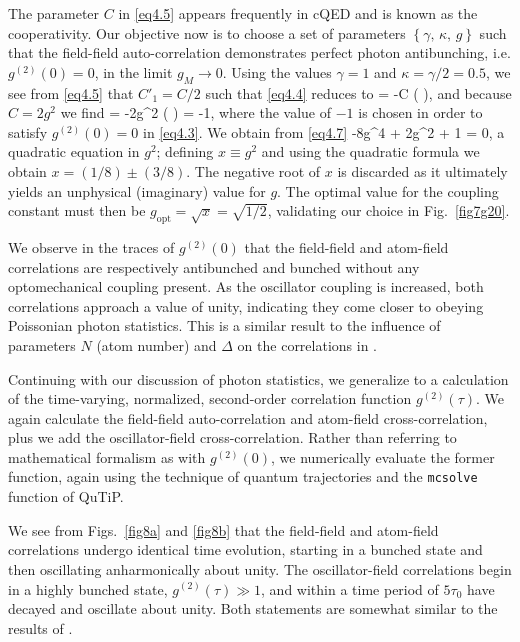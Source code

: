 \noindent The parameter $C$ in \eqref{eq4.5} appears frequently in cQED and is known as the cooperativity. Our objective now is to choose a set of parameters $\left\{ \gamma, \, \kappa, \, g \right\}$ such that the field-field auto-correlation demonstrates perfect photon antibunching, i.e. $g^{(2)}(0) = 0$, in the limit $g_M \to 0$. Using the values $\gamma = 1$ and $\kappa = \gamma/2 = 0.5$, we see from \eqref{eq4.5} that $C'_1 = C/2$ such that \eqref{eq4.4} reduces to
%
\be \frac{\Delta\alpha}{\alpha} = -C \left(  \right), \label{eq4.6} \ee
%
and because $C = 2g^2$ we find
%
\be \frac{\Delta\alpha}{\alpha} = -2g^2 \left(  \right) = -1, \label{eq4.7} \ee
%
where the value of $-1$ is chosen in order to satisfy $g^{(2)}(0) = 0$ in \eqref{eq4.3}. We obtain from \eqref{eq4.7}
%
\be -8g^4 + 2g^2 + 1 = 0, \label{eq4.8} \ee
%
a quadratic equation in $g^2$; defining $x \equiv g^2$ and using the quadratic formula we obtain $x = (1/8) \pm (3/8)$. The negative root of $x$ is discarded as it ultimately yields an unphysical (imaginary) value for $g$. The optimal value for the coupling constant must then be $g_{\text{opt}} = \sqrt{x} = \sqrt{1/2}$, validating our choice in Fig.~\ref{fig7g20}.

We observe in the traces of $g^{(2)}(0)$ that the field-field and atom-field correlations are respectively antibunched and bunched without any optomechanical coupling present. As the oscillator coupling is increased, both correlations approach a value of unity, indicating they come closer to obeying Poissonian photon statistics. This is a similar result to the influence of parameters $N$ (atom number) and $\Delta$ on the correlations in \cite{brecha1999}.

Continuing with our discussion of photon statistics, we generalize to a calculation of the time-varying, normalized, second-order correlation function $g^{(2)}(\tau)$. We again calculate the field-field auto-correlation and atom-field cross-correlation, plus we add the oscillator-field cross-correlation. Rather than referring to mathematical formalism as with $g^{(2)}(0)$, we numerically evaluate the former function, again using the technique of quantum trajectories and the \texttt{mcsolve} function of QuTiP.

We see from Figs.~\ref{fig8a} and \ref{fig8b} that the field-field and atom-field correlations undergo identical time evolution, starting in a bunched state and then oscillating anharmonically about unity. The oscillator-field correlations begin in a highly bunched state, $g^{(2)}(\tau) \gg 1$, and within a time period of $5\tau_0$ have decayed and oscillate about unity. Both statements are somewhat similar to the results of \cite{brecha1999}.

